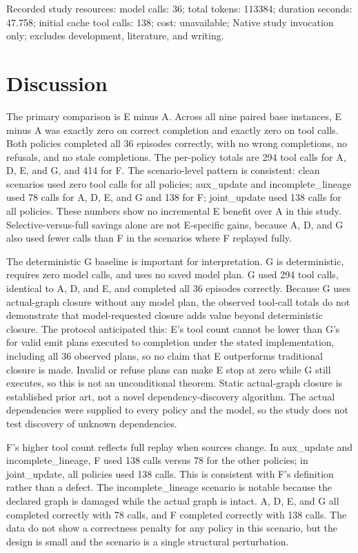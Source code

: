 \documentclass{article}
\begin{document}
Recorded study resources: model calls: 36; total tokens: 113384; duration seconds: 47.758; initial cache tool calls: 138; cost: unavailable; Native study invocation only; excludes development, literature, and writing.

\section{Discussion}

The primary comparison is E minus A. Across all nine paired base instances, E minus A was exactly zero on correct completion and exactly zero on tool calls. Both policies completed all 36 episodes correctly, with no wrong completions, no refusals, and no stale completions. The per-policy totals are 294 tool calls for A, D, E, and G, and 414 for F. The scenario-level pattern is consistent: clean scenarios used zero tool calls for all policies; aux\_update and incomplete\_lineage used 78 calls for A, D, E, and G and 138 for F; joint\_update used 138 calls for all policies. These numbers show no incremental E benefit over A in this study. Selective-versus-full savings alone are not E-specific gains, because A, D, and G also used fewer calls than F in the scenarios where F replayed fully.

The deterministic G baseline is important for interpretation. G is deterministic, requires zero model calls, and uses no saved model plan. G used 294 tool calls, identical to A, D, and E, and completed all 36 episodes correctly. Because G uses actual-graph closure without any model plan, the observed tool-call totals do not demonstrate that model-requested closure adds value beyond deterministic closure. The protocol anticipated this: E's tool count cannot be lower than G's for valid emit plans executed to completion under the stated implementation, including all 36 observed plans, so no claim that E outperforms traditional closure is made. Invalid or refuse plans can make E stop at zero while G still executes, so this is not an unconditional theorem. Static actual-graph closure is established prior art, not a novel dependency-discovery algorithm. The actual dependencies were supplied to every policy and the model, so the study does not test discovery of unknown dependencies.

F's higher tool count reflects full replay when sources change. In aux\_update and incomplete\_lineage, F used 138 calls versus 78 for the other policies; in joint\_update, all policies used 138 calls. This is consistent with F's definition rather than a defect. The incomplete\_lineage scenario is notable because the declared graph is damaged while the actual graph is intact. A, D, E, and G all completed correctly with 78 calls, and F completed correctly with 138 calls. The data do not show a correctness penalty for any policy in this scenario, but the design is small and the scenario is a single structural perturbation.
\end{document}
